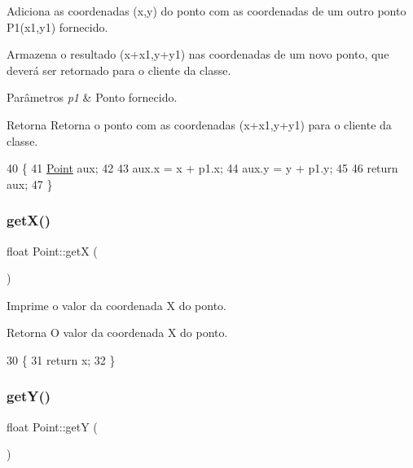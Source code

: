 Adiciona as coordenadas (x,y) do ponto com as coordenadas de um outro ponto P1(x1,y1) fornecido. 

Armazena o resultado (x+x1,y+y1) nas coordenadas de um novo ponto, que deverá ser retornado para o cliente da classe. 
\begin{DoxyParams}{Parâmetros}
{\em p1} & Ponto fornecido. \\
\hline
\end{DoxyParams}
\begin{DoxyReturn}{Retorna}
Retorna o ponto com as coordenadas (x+x1,y+y1) para o cliente da classe. 
\end{DoxyReturn}

\begin{DoxyCode}
40 \{
41     \mbox{\hyperlink{class_point}{Point}} aux;
42 
43     aux.x = x + p1.x;
44     aux.y = y + p1.y;
45 
46     \textcolor{keywordflow}{return} aux;
47 \}
\end{DoxyCode}
\mbox{\label{class_point_acc27466778cc87a662bba40268c4c0c8}} 
\subsubsection{\texorpdfstring{get\+X()}{getX()}}
{\footnotesize\ttfamily float Point\+::getX (\begin{DoxyParamCaption}{ }\end{DoxyParamCaption})}



Imprime o valor da coordenada X do ponto. 

\begin{DoxyReturn}{Retorna}
O valor da coordenada X do ponto. 
\end{DoxyReturn}

\begin{DoxyCode}
30 \{
31     \textcolor{keywordflow}{return} x;
32 \}
\end{DoxyCode}
\mbox{\label{class_point_a3cccbca94719ddde353cce86ce0e2f64}} 
\subsubsection{\texorpdfstring{get\+Y()}{getY()}}
{\footnotesize\ttfamily float Point\+::getY (\begin{DoxyParamCaption}{ }\end{DoxyParamCaption})}



